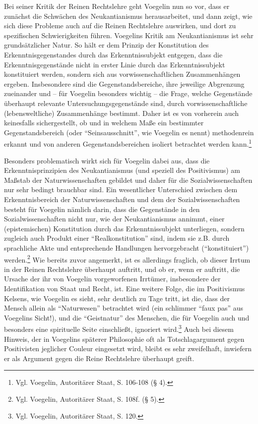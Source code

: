 \documentclass[12pt,a4paper,ngerman]{article}
\begin{document}
Bei seiner Kritik der Reinen Rechtslehre geht Voegelin nun so vor, dass er
zunächst die Schwächen des Neukantianismus herausarbeitet, und dann zeigt, wie
sich diese Probleme auch auf die Reinen Rechtslehre auswirken, und dort zu
spezifischen Schwierigkeiten führen. Voegelins Kritik am Neukantianismus ist
sehr grundsätzlicher Natur. So hält er dem Prinzip der Konstitution des
Erkenntnisgegenstandes durch das Erkenntnissubjekt entgegen, dass die
Erkenntnisgegenstände nicht in erster Linie durch das Erkenntnissubjekt
konstituiert werden, sondern sich aus vorwissenschaftlichen Zusammenhängen
ergeben. Insbesondere sind die Gegenstandsbereiche, ihre jeweilige Abgrenzung
zueinander und -- für Voegelin besonders wichtig -- die Frage, welche
Gegenstände überhaupt relevante Untersuchungsgegenstände sind, durch
vorwissenschaftliche (lebensweltliche) Zusammenhänge bestimmt. Daher ist es
von vorherein auch keinesfalls sichergestellt, ob und in welchem Maße ein
bestimmter Gegenstandsbereich (oder "`Seinsausschnitt"', wie Voegelin es
nennt) methodenrein erkannt und von anderen Gegenstandsbereichen isoliert
betrachtet werden kann.\footnote{Vgl.  Voegelin, Autoritärer Staat, S. 106-108
  (§ 4).}

Besonders problematisch wirkt sich für Voegelin dabei aus, dass die
Erkenntnisprinzipien des Neukantianismus (und speziell des Positivismus)
am Maßstab der Naturwissenschaften gebildet und daher für die
Sozialwissenschaften nur sehr bedingt brauchbar sind. Ein wesentlicher
Unterschied zwischen dem Erkenntnisbereich der Naturwissenschaften und
dem der Sozialwissenschaften besteht für Voegelin nämlich darin, dass
die Gegenstände in den Sozialwissenschaften nicht nur, wie der
Neukantianismus annimmt, einer (epistemischen) Konstitution durch das
Erkenntnissubjekt unterliegen, sondern zugleich auch Produkt einer
"`Realkonstitution"' sind, indem sie z.B. durch sprachliche Akte und
entsprechende Handlungen hervorgebracht ("`konstituiert"')
werden.\footnote{Vgl. Voegelin, Autoritärer Staat, S. 108f. (§ 5).}
Wie bereits zuvor angemerkt, ist es allerdings fraglich, ob dieser
Irrtum in der Reinen Rechtslehre überhaupt auftritt, und ob er, wenn
er auftritt, die Ursache der ihr von Voegelin vorgeworfenen Irrtümer,
insbesondere der Identifikation von Staat und Recht, ist. Eine weitere
Folge, die im Positivismus Kelsens, wie Voegelin es sieht, sehr
deutlich zu Tage tritt, ist die, dass der Mensch allein als "`Naturwesen"'
betrachtet wird (ein schlimmer "`faux pas"' aus Voegelins Sicht!), und die
"`Geistnatur"' des Menschen, die für Voegelin auch und besonders eine
spirituelle Seite einschließt, ignoriert wird.\footnote{Vgl. Voegelin,
  Autoritärer Staat, S. 120.} Auch bei diesem Hinweis, der in
Voegelins späterer Philosophie oft als Totschlagargument gegen
Positivisten jeglicher Couleur eingesetzt wird, bleibt es sehr
zweifelhaft, inwiefern er als Argument gegen die Reine Rechtslehre
überhaupt greift.
\end{document}
